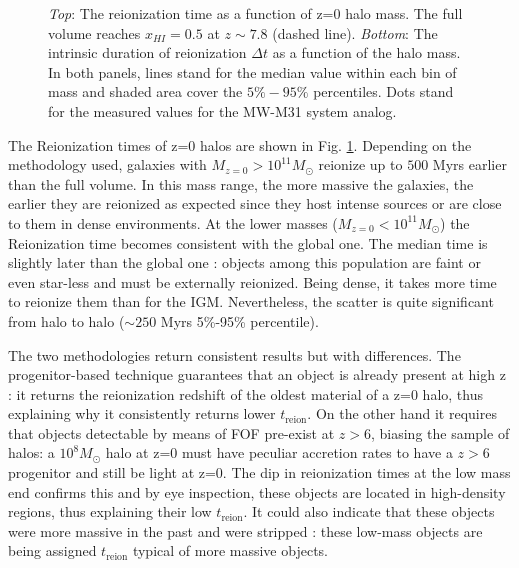 \documentclass[twocolumn]{aastex61}
\begin{document}
\begin{figure}[ht]
\caption{\textit{Top}: The reionization time as a function of z=0 halo mass.
The full volume reaches $x_{HI}=0.5$ at $z\sim 7.8$ (dashed line). %
 \textit{Bottom}: The intrinsic duration of reionization  $\Delta t$ as a function of the halo mass. In both panels, lines stand for the median value within each bin of mass and  shaded area cover the $5\%-95\%$ percentiles. Dots stand for the measured values for the MW-M31 system analog.}
\label{fig:treion}
\end{figure}

The Reionization times of z=0 halos are shown in Fig. \ref{fig:treion}. Depending on the methodology used, galaxies with $M_{z=0}>10^{11} M_\odot$ reionize up to $500$ Myrs earlier than the full volume. In this mass range, the more massive the galaxies, the earlier they are reionized as expected since they host intense sources or are close to them in dense environments. At the lower masses ($M_{z=0}<10^{11} M_\odot$) the Reionization time becomes consistent with the global one.  The median time is slightly later than the global one : objects among this population are faint or even star-less and must be externally reionized. Being dense, it takes more time to reionize them than for the IGM.  Nevertheless, the scatter is quite significant from halo to halo ($\sim 250$ Myrs 5\%-95\% percentile).

The two methodologies return consistent results but with differences. The progenitor-based technique guarantees that an object is already present at high z : it returns the reionization redshift of the oldest material of a z=0 halo, thus explaining why it consistently returns lower $t_\mathrm{reion}$. On the other hand it requires that objects detectable by means of FOF pre-exist at $z>6$, biasing the sample of halos:  a $10^8 M_\odot$ halo at z=0  must have peculiar accretion rates to have a $z>6$ progenitor and still be light at z=0. The dip in reionization times at the low mass end confirms this and  by eye inspection, these objects are located in high-density regions, thus explaining their low $t_\mathrm{reion}$. It could also indicate that these objects were more massive in the past and were stripped : these low-mass objects are being assigned $t_\mathrm{reion}$ typical of more massive objects.
\end{document}
